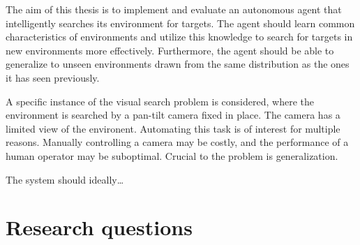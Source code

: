 The aim of this thesis is to implement and evaluate an autonomous agent that intelligently searches its environment for targets.
The agent should learn common characteristics of environments and utilize this knowledge to search for targets in new environments more effectively.
Furthermore, the agent should be able to generalize to unseen environments drawn from the same distribution as the ones it has seen previously.

A specific instance of the visual search problem is considered, where the environment is searched by a pan-tilt camera fixed in place.
The camera has a limited view of the environent.
Automating this task is of interest for multiple reasons.
Manually controlling a camera may be costly, and the performance of a human operator may be suboptimal.
Crucial to the problem is generalization.

The system should ideally\dots





% 

\section{Research questions}
\label{sec:research-questions}


